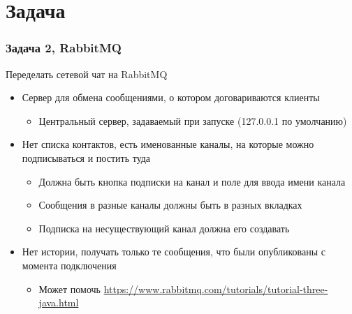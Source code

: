 \documentclass[xetex,mathserif,serif]{beamer}
\begin{document}
    \section{Задача}

    \begin{frame}
        \frametitle{Задача 2, RabbitMQ}
        Переделать сетевой чат на RabbitMQ
        \begin{itemize}
            \item Сервер для обмена сообщениями, о котором договариваются клиенты
            \begin{itemize}
                \item Центральный сервер, задаваемый при запуске (127.0.0.1 по умолчанию)
            \end{itemize}
            \item Нет списка контактов, есть именованные каналы, на которые можно подписываться и постить туда
            \begin{itemize}
                \item Должна быть кнопка подписки на канал и поле для ввода имени канала
                \item Сообщения в разные каналы должны быть в разных вкладках
                \item Подписка на несуществующий канал должна его создавать
            \end{itemize}
            \item Нет истории, получать только те сообщения, что были опубликованы с момента подключения
            \begin{itemize}
                \item Может помочь \url{https://www.rabbitmq.com/tutorials/tutorial-three-java.html}
            \end{itemize}
        \end{itemize}
    \end{frame}
\end{document}
